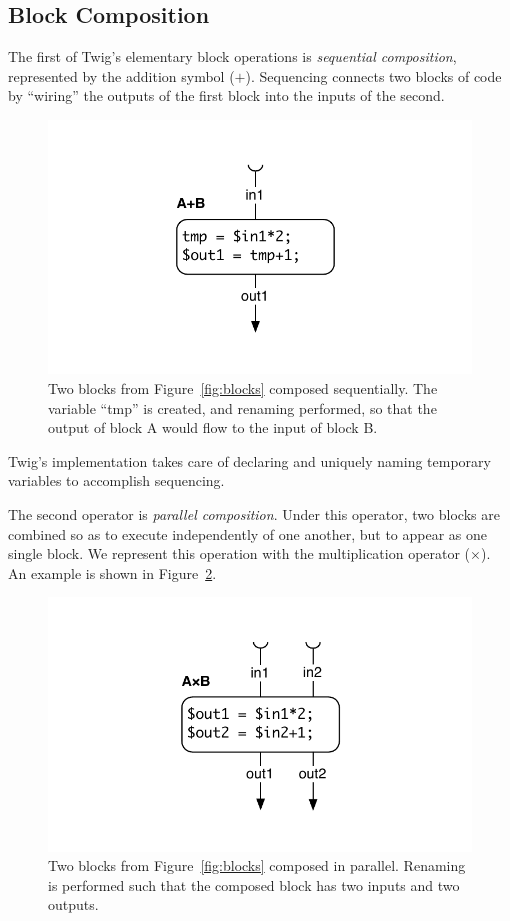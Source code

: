 \subsection{Block Composition}

The first of Twig's elementary block operations is  \emph{sequential composition}, represented by the addition symbol ($+$). Sequencing connects two blocks of code by ``wiring'' the outputs of the first block into the inputs of the second. 

\begin{figure}[ht]
\centering
\includegraphics[width=0.75\columnwidth]{images/code-gen2}
\caption{Two blocks from Figure~\ref{fig:blocks} composed sequentially. The variable ``tmp'' is created, and renaming performed, so that the output of block A would flow to the input of block B.}
\label{fig:codegen-seq}
\end{figure}

Twig's implementation takes care of declaring and uniquely naming temporary variables to accomplish sequencing.

The second operator is \emph{parallel composition}. Under this operator, two blocks are combined so as to execute independently of one another, but to appear as one single block. We represent this operation with the multiplication operator ($\times$). An example is shown in Figure~\ref{fig:codegen-par}.

\begin{figure}[ht]
\centering
\includegraphics[width=0.75\columnwidth]{images/code-gen3}
\caption{Two blocks from Figure~\ref{fig:blocks} composed in parallel. Renaming is performed such that the composed block has two inputs and two outputs.}
\label{fig:codegen-par}
\end{figure}

